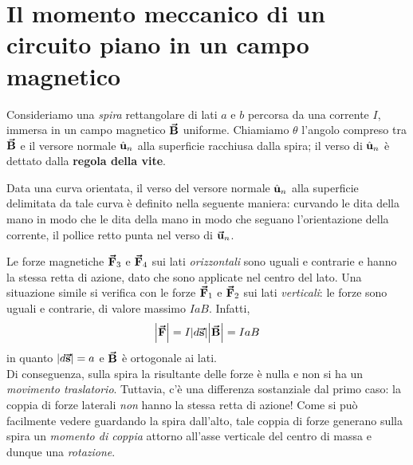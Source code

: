 \section{Il momento meccanico di un circuito piano in un campo magnetico}
Consideriamo una \textit{spira} rettangolare di lati $a$ e $b$ percorsa da una corrente $I$, immersa in un campo magnetico $\vb*{\va{B}}$ uniforme. Chiamiamo $\theta$ l'angolo compreso tra $\vb*{\va{B}}$ e il versore normale $\hat{\mathbf{u}}_n$ alla superficie racchiusa dalla spira; il verso di $\hat{\mathbf{u}}_n$ è dettato dalla \textbf{regola della vite}.
\begin{define}
	Data una curva orientata, il verso del versore normale $\hat{\mathbf{u}}_n$ alla superficie delimitata da tale curva è definito nella seguente maniera: curvando le dita della mano in modo che le dita della mano in modo che seguano l'orientazione della corrente, il pollice retto punta nel verso di $\vb*{\va{u}}_n$.
\end{define}
Le forze magnetiche $\vb*{\va{F}}_3$ e $\vb*{\va{F}}_4$ sui lati \textit{orizzontali} sono uguali e contrarie e hanno la stessa retta di azione, dato che sono applicate nel centro del lato.
Una situazione simile si verifica con le forze $\vb*{\va{F}}_{1}$ e $\vb*{\va{F}}_2$ sui lati \textit{verticali}: le forze sono uguali e contrarie, di valore massimo $IaB$. Infatti,
	\begin{equation*}
		\abs{\vb*{\va{F}}}=I\abs{d\vb*{\va{s}}}\abs{\vb*{\va{B}}}=IaB
	\end{equation*}
in quanto $\abs{d\vb*{\va{s}}}=a$ e $\vb*{\va{B}}$ è ortogonale ai lati.\\ 
Di conseguenza, sulla spira la risultante delle forze è nulla e non si ha un \textit{movimento traslatorio}.
Tuttavia, c'è una differenza sostanziale dal primo caso: la coppia di forze laterali \textit{non} hanno la stessa retta di azione! Come si può facilmente vedere guardando la spira dall'alto, tale coppia di forze generano sulla spira un \textit{momento di coppia} attorno all'asse verticale del centro di massa e dunque una \textit{rotazione}.

